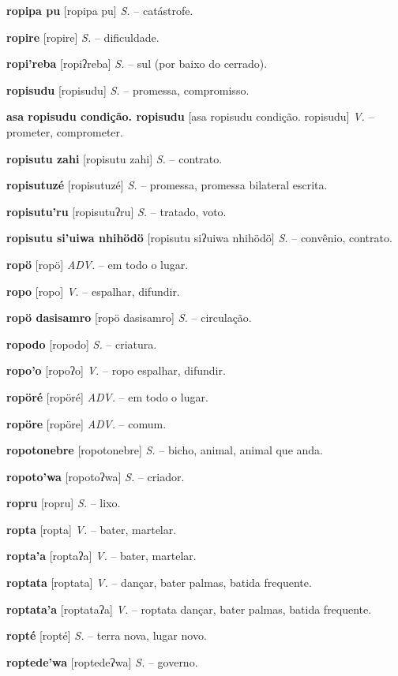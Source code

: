 \textbf{ropipa pu} [ropipa pu] \textit{S.} -- catástrofe.

\textbf{ropire} [ropire] \textit{S.} -- dificuldade.

\textbf{ropi'reba} [ropiʔreba] \textit{S.} -- sul (por baixo do cerrado).

\textbf{ropisudu} [ropisudu] \textit{S.} -- promessa, compromisso.

\textbf{asa ropisudu condição. ropisudu} [asa ropisudu condição. ropisudu] \textit{V.} -- prometer, comprometer.

\textbf{ropisutu zahi} [ropisutu zahi] \textit{S.} -- contrato.

\textbf{ropisutuzé} [ropisutuzé] \textit{S.} -- promessa, promessa bilateral escrita.

\textbf{ropisutu'ru} [ropisutuʔru] \textit{S.} -- tratado, voto.

\textbf{ropisutu si'uiwa nhihödö} [ropisutu siʔuiwa nhihödö] \textit{S.} -- convênio, contrato.

\textbf{ropö} [ropö] \textit{ADV.} -- em todo o lugar.

\textbf{ropo} [ropo] \textit{V.} -- espalhar, difundir.

\textbf{ropö dasisamro} [ropö dasisamro] \textit{S.} -- circulação.

\textbf{ropodo} [ropodo] \textit{S.} -- criatura.

\textbf{ropo'o} [ropoʔo] \textit{V.} -- ropo espalhar, difundir.

\textbf{ropöré} [ropöré] \textit{ADV.} -- em todo o lugar.

\textbf{ropöre} [ropöre] \textit{ADV.} -- comum.

\textbf{ropotonebre} [ropotonebre] \textit{S.} -- bicho, animal, animal que anda.

\textbf{ropoto'wa} [ropotoʔwa] \textit{S.} -- criador.

\textbf{ropru} [ropru] \textit{S.} -- lixo.

\textbf{ropta} [ropta] \textit{V.} -- bater, martelar.

\textbf{ropta'a} [roptaʔa] \textit{V.} -- bater, martelar.

\textbf{roptata} [roptata] \textit{V.} -- dançar, bater palmas, batida frequente.

\textbf{roptata'a} [roptataʔa] \textit{V.} -- roptata dançar, bater palmas, batida frequente.

\textbf{ropté} [ropté] \textit{S.} -- terra nova, lugar novo.

\textbf{roptede'wa} [roptedeʔwa] \textit{S.} -- governo.

